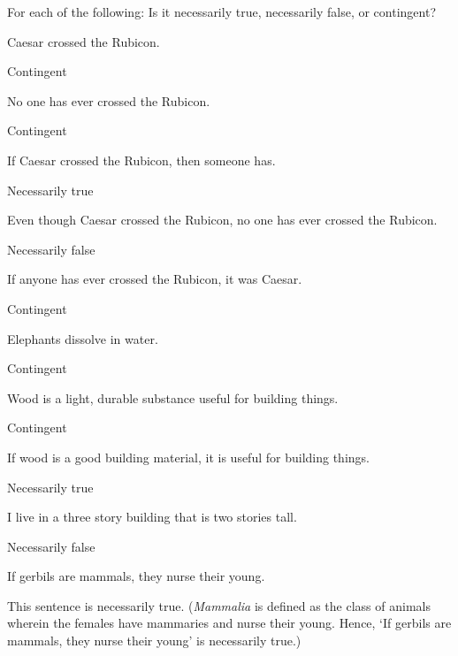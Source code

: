 \problempart
\label{pr.EnglishTautology}
For each of the following: Is it necessarily true, necessarily false, or contingent?
\begin{earg}
\item Caesar crossed the Rubicon.
\item[] Contingent\smallskip


\item No one has ever crossed the Rubicon.
\item[] Contingent\smallskip
\item If Caesar crossed the Rubicon, then someone has.
\item[] Necessarily true\smallskip
\item Even though Caesar crossed the Rubicon, no one has ever crossed the Rubicon.
\item[] Necessarily false\smallskip
\item If anyone has ever crossed the Rubicon, it was Caesar.
\item[] Contingent\smallskip

\item Elephants dissolve in water.
\item[] Contingent\smallskip
\item Wood is a light, durable substance useful for building things.
\item[] Contingent\smallskip
\item If wood is a good building material, it is useful for building things.
\item[] Necessarily true\smallskip
\item I live in a three story building that is two stories tall.
\item[] Necessarily false\smallskip
\item If gerbils are mammals, they nurse their young.
\item[] This sentence is necessarily true. (\textit{Mammalia} is defined as the class of animals wherein the females have mammaries and nurse their young. Hence, `If gerbils are mammals, they nurse their young' is necessarily true.)
\end{earg}

\problempart 

